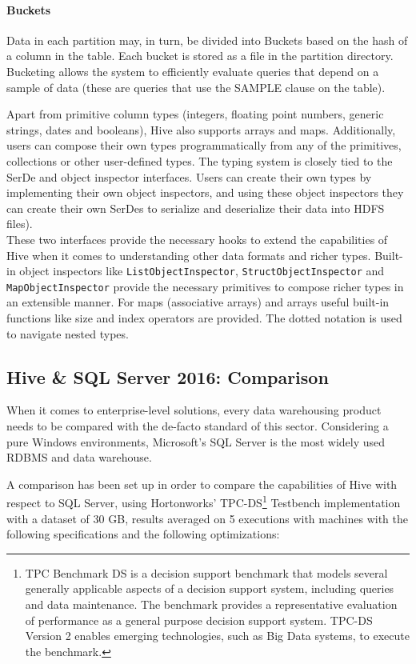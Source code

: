 \paragraph{Buckets} Data in each partition may, in turn, be divided into Buckets based on the hash of a column in the table. Each bucket is stored as a file in the partition directory. Bucketing allows the system to efficiently evaluate queries that depend on a sample of data (these are queries that use the SAMPLE clause on the table).
\newline
\par
Apart from primitive column types (integers, floating point numbers, generic strings, dates and booleans), Hive also supports arrays and maps. Additionally, users can compose their own types programmatically from any of the primitives, collections or other user-defined types. The typing system is closely tied to the SerDe and object inspector interfaces. Users can create their own types by implementing their own object inspectors, and using these object inspectors they can create their own SerDes to serialize and deserialize their data into HDFS files).\\
These two interfaces provide the necessary hooks to extend the capabilities of Hive when it comes to understanding other data formats and richer types. Built-in object inspectors like \verb|ListObjectInspector|, \verb|StructObjectInspector| and \verb|MapObjectInspector| provide the necessary primitives to compose richer types in an extensible manner. For maps (associative arrays) and arrays useful built-in functions like size and index operators are provided. The dotted notation is used to navigate nested types.

\subsection{Hive \& SQL Server 2016: Comparison}

When it comes to enterprise-level solutions, every data warehousing product needs to be compared with the de-facto standard of this sector. Considering a pure Windows environments, Microsoft's SQL Server is the most widely used RDBMS and data warehouse.\newline

A comparison has been set up in order to compare the capabilities of Hive with respect to SQL Server, using Hortonworks' TPC-DS\footnote{TPC Benchmark DS is a decision support benchmark that models several generally applicable aspects of a decision support system, including queries and data maintenance. The benchmark provides a representative evaluation of performance as a general purpose decision support system. TPC-DS Version 2 enables emerging technologies, such as Big Data systems, to execute the benchmark.} Testbench implementation with a dataset of 30 GB, results averaged on 5 executions with machines with the following specifications and the following optimizations:
\newline

